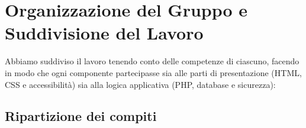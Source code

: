 \documentclass[a4paper,11pt]{article}
\begin{document}
\section{Organizzazione del Gruppo e Suddivisione del Lavoro}

Abbiamo suddiviso il lavoro tenendo conto delle competenze di ciascuno, facendo in modo che ogni componente partecipasse sia alle parti di presentazione (HTML, CSS e accessibilità) sia alla logica applicativa (PHP, database e sicurezza):

\subsection{Ripartizione dei compiti}
\end{document}
